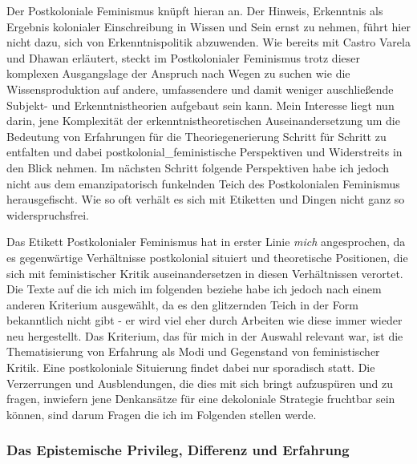 Der Postkoloniale Feminismus knüpft hieran an. Der Hinweis, Erkenntnis als
Ergebnis kolonialer Einschreibung in Wissen und Sein ernst zu nehmen, führt
hier nicht dazu, sich von Erkenntnispolitik abzuwenden. Wie bereits mit Castro
Varela und Dhawan erläutert, steckt im Postkolonialer Feminismus trotz dieser
komplexen Ausgangslage der Anspruch nach Wegen zu suchen wie die
Wissensproduktion auf andere, umfassendere und damit weniger auschließende
Subjekt- und Erkenntnistheorien aufgebaut sein kann. Mein Interesse liegt nun
darin, jene Komplexität der erkenntnistheoretischen Auseinandersetzung um die
Bedeutung von Erfahrungen für die Theoriegenerierung Schritt für Schritt zu
entfalten und dabei postkolonial\_feministische Perspektiven und Widerstreits in
den Blick nehmen. Im nächsten Schritt folgende Perspektiven habe ich jedoch
nicht aus dem emanzipatorisch funkelnden Teich des Postkolonialen Feminismus
herausgefischt. Wie so oft verhält es sich mit Etiketten und Dingen nicht ganz
so widerspruchsfrei.

Das Etikett Postkolonialer Feminismus hat in erster Linie \textit{mich} angesprochen, da
es gegenwärtige Verhältnisse postkolonial situiert und theoretische Positionen,
die sich mit feministischer Kritik auseinandersetzen in diesen Verhältnissen
verortet. Die Texte auf die ich mich im folgenden beziehe habe ich jedoch nach
einem anderen Kriterium ausgewählt, da es den glitzernden Teich in der Form
bekanntlich nicht gibt - er wird viel eher durch Arbeiten wie diese immer
wieder neu hergestellt. Das Kriterium, das für mich in der Auswahl relevant
war, ist die Thematisierung von Erfahrung als Modi und Gegenstand von
feministischer Kritik. Eine postkoloniale Situierung findet dabei nur
sporadisch statt. Die Verzerrungen und Ausblendungen, die dies mit sich bringt
aufzuspüren und zu fragen, inwiefern jene Denkansätze für eine dekoloniale
Strategie fruchtbar sein können, sind darum Fragen die ich im Folgenden stellen
werde.

\subsubsection{Das Epistemische Privileg, Differenz und Erfahrung}

